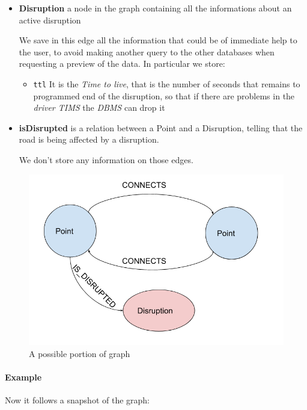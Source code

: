 \begin{itemize}
	\item \textbf{Disruption} a node in the graph containing all the 
	informations about an active disruption
	
	
	
	We save in this edge all the information that could be of immediate help to 
	the user, to avoid making another query to the other databases when 
	requesting a preview of the data. In particular we store:
	
	\begin{itemize}
		\item \texttt{ttl} It is the \textit{Time to live}, that is the number 
		of seconds that remains to programmed end of the disruption, so that if 
		there are problems in the \textit{driver TIMS} the \textit{DBMS} can 
		drop it
	\end{itemize}
	
	\item \textbf{isDisrupted} is a relation between a Point and a Disruption, 
	telling that the road is being affected by a disruption.
	
	We don't store any information on those edges.

\end{itemize}
	
\begin{figure}[H]
	\centering
	\includegraphics[width=0.7\linewidth]{assets/schemaneo4j}
	\caption{A possible portion of graph}
	\label{fig:schemaneo4j}
\end{figure}

\paragraph{Example}
Now it follows a snapshot of the graph:




